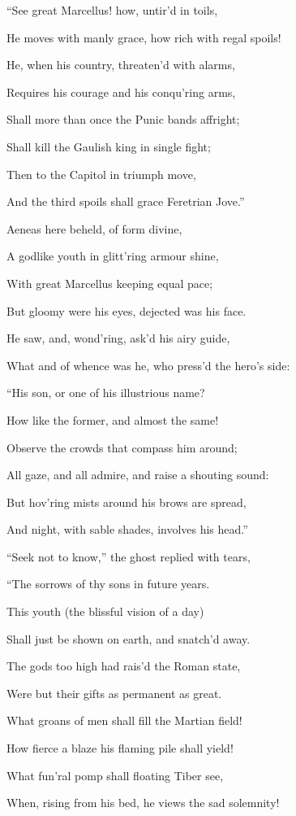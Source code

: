 “See great Marcellus! how, untir’d in toils,

He moves with manly grace, how rich with regal spoils!

He, when his country, threaten’d with alarms,

Requires his courage and his conqu’ring arms,

Shall more than once the Punic bands affright;

Shall kill the Gaulish king in single fight;

Then to the Capitol in triumph move,

And the third spoils shall grace Feretrian Jove.”

Aeneas here beheld, of form divine,

A godlike youth in glitt’ring armour shine,

With great Marcellus keeping equal pace;

But gloomy were his eyes, dejected was his face.

He saw, and, wond’ring, ask’d his airy guide,

What and of whence was he, who press’d the hero’s side:

“His son, or one of his illustrious name?

How like the former, and almost the same!

Observe the crowds that compass him around;

All gaze, and all admire, and raise a shouting sound:

But hov’ring mists around his brows are spread,

And night, with sable shades, involves his head.”

“Seek not to know,” the ghost replied with tears,

“The sorrows of thy sons in future years.

This youth (the blissful vision of a day)

Shall just be shown on earth, and snatch’d away.

The gods too high had rais’d the Roman state,

Were but their gifts as permanent as great.

What groans of men shall fill the Martian field!

How fierce a blaze his flaming pile shall yield!

What fun’ral pomp shall floating Tiber see,

When, rising from his bed, he views the sad solemnity!

